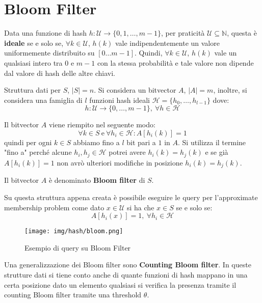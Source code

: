 \section{Bloom Filter}
\begin{definizione} 
    Data una funzione di hash $h : \mathcal{U} \to \{0, 1, \dots, m - 1\}$, per praticità $\mathcal{U} \subseteq \mathbb{N}$, questa è \textbf{ideale} se e solo se, $\forall k \in \mathcal{U}$, $h(k)$ vale indipendentemente un valore uniformemente distribuito su $[0 \dots m - 1]$. Quindi, $\forall k \in \mathcal{U}$, $h(k)$ vale un qualsiasi intero tra $0$ e $m - 1$ con la stessa probabilità e tale valore non dipende dal valore di hash delle altre chiavi.
\end{definizione}

Struttura dati per $S$, $|S| = n$. Si considera un bitvector $A$, $|A| = m$, inoltre, si considera una famiglia di $l$ funzioni hash ideali $\mathcal{H} = \{h_0, \dots, h_{l - 1}\}$ dove:
\begin{equation}
    h: \mathcal{U} \to \{0, \dots, m - 1\}, \ \forall h \in \mathcal{H}
\end{equation}

Il bitvector $A$ viene riempito nel seguente modo:
\begin{equation}
    \forall k \in S \ \text{e} \ \forall h_i \in \mathcal{H}: A[h_i(k)] = 1
\end{equation}
quindi per ogni $k \in S$ abbiamo fino a $l$ bit pari a $1$ in $A$. Si utilizza il termine "fino a" perché alcune $h_i, h_j \in \mathcal{H}$ potrei avere $h_i(k) = h_j(k)$ e se già $A[h_i(k)] = 1$ non avrò ulteriori modifiche in posizione $h_i(k) = h_j(k)$.

Il bitvector $A$ è denominato \textbf{Bloom filter} di $S$.

Su questa struttura appena creata è possibile eseguire le query per l'approximate membership problem come dato $x \in \mathcal{U}$ si ha che $x \in S$ se e solo se:
\begin{equation}
    A[h_i(x)] = 1, \ \forall h_i \in \mathcal{H}
\end{equation}
\begin{figure}[!ht]
    \centering
    \texttt{[image: img/hash/bloom.png]}
    \caption{Esempio di query su Bloom Filter}
\end{figure}
\newpage
Una generalizzazione dei Bloom filter sono \textbf{Counting Bloom filter}. In queste strutture dati si tiene conto anche di quante funzioni di hash mappano in una certa posizione dato un elemento qualsiasi si verifica la presenza tramite il counting Bloom filter tramite una threshold $\theta$.


